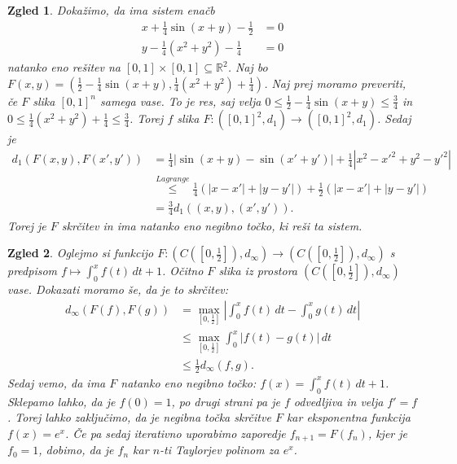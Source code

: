 \documentclass[10pt, a4paper]{article}
\newtheorem{zgled}{Zgled}[section]
\newcommand{\R}{\mathbb {R}}
\begin{document}
\begin{zgled}
    Dokažimo, da ima sistem enačb 
    \begin{align*}
        x + \frac{1}{4} \sin (x+y) - \frac{1}{2} &= 0\\
        y - \frac{1}{4} \left(x^2 + y^2 \right) - \frac{1}{4} &= 0
    \end{align*}
    natanko eno rešitev na $[0, 1] \times [0, 1] \subseteq \R^2$.
    Naj bo $F(x,y) = \left( \frac{1}{2} - \frac{1}{4} \sin (x+y), \frac{1}{4} \left(x^2 + y^2 \right) + \frac{1}{4} \right)$.
    Naj prej moramo preveriti, če $F$ slika $[0, 1]^n$ samega vase.
    To je res, saj velja $0 \leq \frac{1}{2} - \frac{1}{4} \sin (x+y) \leq \frac{3}{4}$ in 
    $0\leq \frac{1}{4} \left(x^2 + y^2 \right) + \frac{1}{4} \leq \frac{3}{4}$.
    Torej $f$ slika $F: \left([0,1]^2, d_1 \right) \rightarrow \left([0,1]^2, d_1 \right)$.
    Sedaj je \begin{align*}
        d_1 (F(x,y), F(x',y')) &= \frac{1}{4} \left| \sin (x+y) - \sin (x' + y') \right| + \frac{1}{4} \left| x^2 - x'^2 + y^2 - y'^2 \right|\\
        &\stackrel{Lagrange}{\leq} \frac{1}{4} \left( |x-x'| + |y-y'| \right) + \frac{1}{2} \left( |x-x'| + |y-y'| \right)\\
        &= \frac{3}{4} d_1 ((x,y), (x',y')).
    \end{align*}
    Torej je $F$ skrčitev in ima natanko eno negibno točko, ki reši ta sistem.
\end{zgled}

\begin{zgled}
    Oglejmo si funkcijo $F: \left(C\left(\left[0, \frac{1}{2} \right]\right), d_\infty \right) \rightarrow \left(C\left(\left[0, \frac{1}{2} \right]\right), d_\infty \right)$ 
    s predpisom $f \mapsto \int_0 ^x f(t)\,dt + 1$.
    Očitno $F$ slika iz prostora $\left(C\left(\left[0, \frac{1}{2} \right]\right), d_\infty \right)$ vase.
    Dokazati moramo še, da je to skrčitev:
    \begin{align*}
        d_\infty (F(f), F(g)) &= \max_{\left[0, \frac{1}{2}\right]} \left| \int_0 ^x f(t)\,dt - \int_0 ^x g(t)\,dt \right|\\
        &\leq \max_{\left[0, \frac{1}{2}\right]}  \int_0 ^x \left|f(t)- g(t)\right|\,dt \\
        &\leq \frac{1}{2} d_\infty (f, g).
    \end{align*}
    Sedaj vemo, da ima $F$ natanko eno negibno točko: $f(x) = \int_0 ^x f(t)\,dt + 1$.
    Sklepamo lahko, da je $f(0) = 1$, po drugi strani pa je $f$ odvedljiva in velja $f' = f$.
    Torej lahko zaključimo, da je negibna točka skrčitve $F$ kar eksponentna funkcija $f(x) = e^x$.
    Če pa sedaj iterativno uporabimo zaporedje $f_{n+1} = F(f_n)$, kjer je $f_0 = 1$,
    dobimo, da je $f_n$ kar $n$-ti Taylorjev polinom za $e^x$.
\end{zgled}
\end{document}

